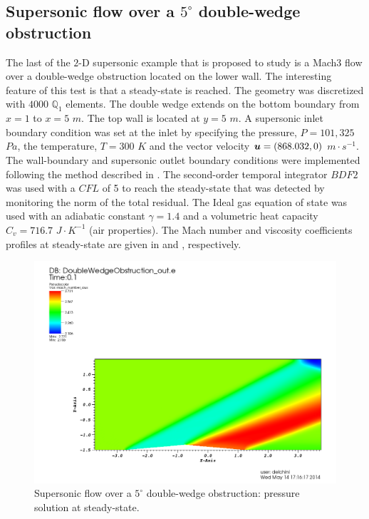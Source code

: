 \subsection{Supersonic flow over a $5^\circ$ double-wedge obstruction} \label{sec:double_wedge}
The last of the $2$-D supersonic example that is proposed to study is a Mach$3$ flow over a double-wedge obstruction located on the lower wall. The interesting feature of this test is that a steady-state is reached. The geometry was discretized with $4000$ $\mathbb Q_1$ elements. The double wedge extends on the bottom boundary from $x=1$ to $x=5$  $m$. The top wall is located at $y=5$ $m$. A supersonic inlet boundary condition was set at the inlet by specifying the pressure, $P=101,325$ $Pa$, the temperature, $T=300$ $K$ and the vector velocity $\boldsymbol u = (868.032, 0)$ $m \cdot s^{-1}$. The wall-boundary and supersonic outlet boundary conditions were implemented following the method described in . The second-order temporal integrator $BDF2$ was used with a $CFL$ of 5 to reach the steady-state that was detected by monitoring the norm of the total residual. The Ideal gas equation of state was used with an adiabatic constant $\gamma = 1.4$ and a volumetric heat capacity $C_v = 716.7$ $J \cdot K^{-1}$ (air properties). The Mach number and viscosity coefficients profiles at steady-state are given in  and , respectively. 
        \begin{figure}[H]%
                \centering
                \includegraphics[width=\textwidth]{figures/DWOMachNumberStt.png}
                \caption{Supersonic flow over a $5^\circ$ double-wedge obstruction: pressure solution at steady-state.}
                \label{fig:2d_dbwd_stt}
        \end{figure}%
